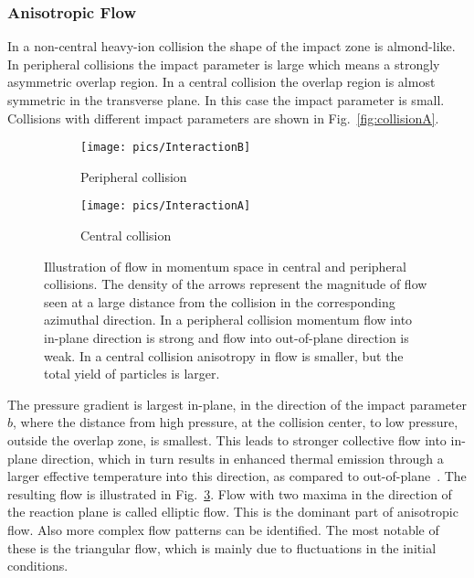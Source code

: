 \subsubsection{Anisotropic Flow}
In a non-central heavy-ion collision the shape of the impact zone is almond-like. In peripheral collisions the impact parameter is large which means a strongly asymmetric overlap region.  In a central collision the overlap region is almost symmetric in the transverse plane. In this case the impact parameter is small. Collisions with different impact parameters are shown in Fig.~\ref{fig:collisionA}.

\begin{figure}[b!]
\centering
        \begin{subfigure}[b]{0.52\textwidth}
                \centering
            	\texttt{[image: pics/InteractionB]}
                \caption{Peripheral collision}
                \label{fig:InteractionB}
        \end{subfigure}
        \begin{subfigure}[b]{0.45\textwidth}
                \centering
               \texttt{[image: pics/InteractionA]}
                \caption{Central collision}
                \label{fig:InteractionA}
        \end{subfigure}
	\caption[Illustration of flow in momentum space in central and peripheral collisions.]{Illustration of flow in momentum space in central and peripheral collisions. The density of the arrows represent the magnitude of flow seen at a large distance from the collision in the corresponding azimuthal direction. In a peripheral collision momentum flow into in-plane direction is strong and flow into out-of-plane direction is weak. In a central collision anisotropy in flow is smaller, but the total yield of particles is larger.}
	\label{fig:flow}
\end{figure}

The pressure gradient is largest in-plane, in the direction of the impact parameter $b$, where the distance from high pressure, at the collision center, to low pressure, outside the overlap zone, is smallest. This leads to stronger collective flow into in-plane direction, which in turn results in enhanced thermal emission through a larger effective temperature into this direction, as compared to out-of-plane~\cite{Ollitrault:1992,Ollitrault:1993, Heinz:2002}. The resulting flow is illustrated in Fig.~\ref{fig:flow}. Flow with two maxima in the direction of the reaction plane is called elliptic flow. This is the dominant part of anisotropic flow. Also more complex flow patterns can be identified. The most notable of these is the triangular flow, which is mainly due to fluctuations in the initial conditions.

